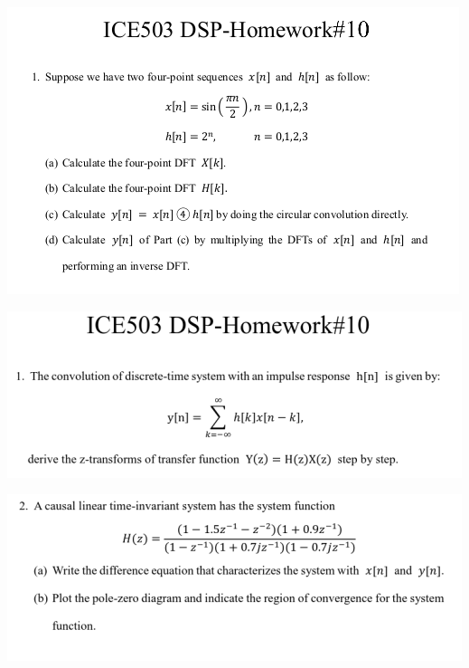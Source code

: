 \documentclass[a4paper]{article}
\begin{document}

	
	\begin{center}
		\includegraphics[width=1.25\linewidth]{screenshot001}
	\end{center}
	\newpage
	
	\begin{center}
		\includegraphics[width=1.25\linewidth]{screenshot002}
	\end{center}
	\newpage
	
	\begin{center}
		\includegraphics[width=1.25\linewidth]{screenshot003}
	\end{center}
	\newpage
	
\end{document}
